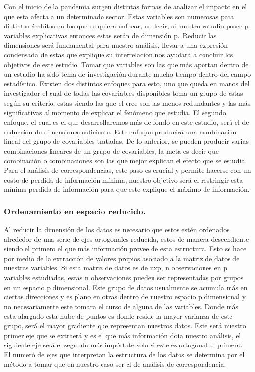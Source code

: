 Con el inicio de la pandemia surgen distintas formas de analizar el
impacto en el que esta afecta a un determinado sector. Estas variables
son numerosas para distintos ámbitos en los que se quiera enfocar, es
decir, si nuestro estudio posee p-variables explicativas entonces estas
serán de dimensión p.~Reducir las dimensiones será fundamental para
nuestro análisis, llevar a una expresión condensada de estas que
explique su interrelación nos ayudará a concluir los objetivos de este
estudio. Tomar que variables son las que más aportan dentro de un
estudio ha sido tema de investigación durante mucho tiempo dentro del
campo estadístico. Existen dos distintos enfoques para esto, uno que
queda en manos del investigador el cual de todas las covariables
disponibles toma un grupo de estas según su criterio, estas siendo las
que el cree son las menos redundantes y las más significativas al
momento de explicar el fenómeno que estudia. El segundo enfoque, el cual
es el que desarrollaremos más de fondo en este estudio, será el de
reducción de dimensiones suficiente. Este enfoque producirá una
combinación lineal del grupo de covariables tratadas. De lo anterior, se
pueden producir varias combinaciones lineares de un grupo de
covariables, la meta es decir que combinación o combinaciones son las
que mejor explican el efecto que se estudia. Para el análisis de
correspondencias, este paso es crucial y permite hacerse con un costo de
perdida de información mínima, nuestro objetivo será el restringir esta
mínima perdida de información para que este explique el máximo de
información.

\hypertarget{ordenamiento-en-espacio-reducido.}{%
\subsubsection{Ordenamiento en espacio
reducido.}\label{ordenamiento-en-espacio-reducido.}}

Al reducir la dimensión de los datos es necesario que estos estén
ordenados alrededor de una serie de ejes ortogonales reducida, estos de
manera descendiente siendo el primero el que más información provee de
esta estructura. Esto se hace por medio de la extracción de valores
propios asociado a la matriz de datos de nuestras variables. Si esta
matriz de datos es de nxp, n observaciones en p variables estudiadas,
estas n observaciones pueden ser representadas por grupos en un espacio
p dimensional. Este grupo de datos usualmente se acumula más en ciertas
direcciones y es plano en otras dentro de nuestro espacio p dimensional
y no necesariamente este tomara el curso de alguna de las variables.
Donde más esta alargado esta nube de puntos es donde reside la mayor
varianza de este grupo, será el mayor gradiente que representan nuestros
datos. Este será nuestro primer eje que se extraerá y es el que más
información dota nuestro análisis, el siguiente eje será el segundo más
impórtate solo si este es ortogonal al primero. El numeró de ejes que
interpretan la estructura de los datos se determina por el método a
tomar que en nuestro caso ser el de análisis de correspondencia.

